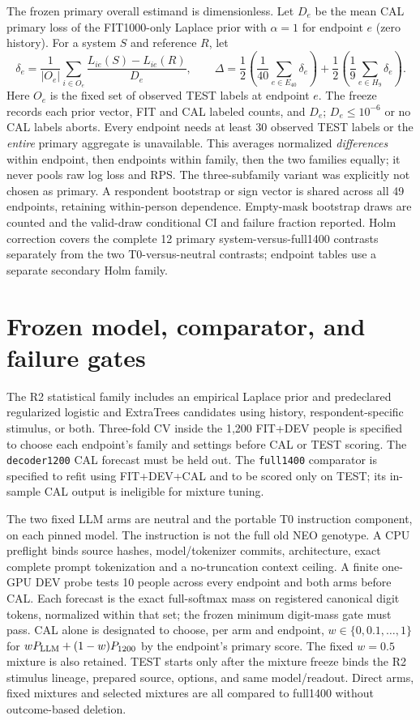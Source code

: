 \documentclass[10pt]{article}
\begin{document}
The frozen primary overall estimand is dimensionless. Let $D_e$ be the
mean CAL primary loss of the FIT1000-only Laplace prior with $\alpha=1$
for endpoint $e$ (zero history). For a system $S$ and reference $R$, let
\[
 \delta_e=\frac{1}{|O_e|}\sum_{i\in O_e}
 \frac{L_{ie}(S)-L_{ie}(R)}{D_e},\qquad
 \Delta=\frac12\left(\frac1{40}\sum_{e\in E_{40}}\delta_e\right)
       +\frac12\left(\frac1{9}\sum_{e\in H_9}\delta_e\right).
\]
Here $O_e$ is the fixed set of observed TEST labels at endpoint $e$.
The freeze records each prior vector, FIT and CAL labeled counts, and
$D_e$; $D_e\leq10^{-6}$ or no CAL labels aborts. Every endpoint needs at
least 30 observed TEST labels or the \emph{entire} primary aggregate is
unavailable. This averages normalized \emph{differences} within endpoint,
then endpoints within family, then the two families equally; it never pools
raw log loss and RPS. The three-subfamily variant was explicitly not chosen
as primary. A respondent bootstrap or sign vector is shared across all 49
endpoints, retaining within-person dependence. Empty-mask bootstrap draws
are counted and the valid-draw conditional CI and failure fraction reported.
Holm correction covers the complete 12 primary system-versus-full1400
contrasts separately from the two T0-versus-neutral contrasts; endpoint
tables use a separate secondary Holm family.

\section{Frozen model, comparator, and failure gates}
\label{sec:gates}
The R2 statistical family includes an empirical Laplace prior and
predeclared regularized logistic and ExtraTrees candidates using history,
respondent-specific stimulus, or both. Three-fold CV inside the 1,200
FIT+DEV people is specified to choose each endpoint's family and settings
before CAL or TEST scoring. The \texttt{decoder1200} CAL forecast must be
held out. The \texttt{full1400} comparator is specified to refit using
FIT+DEV+CAL and to be scored only on TEST; its in-sample CAL output is
ineligible for mixture tuning.

The two fixed LLM arms are neutral and the portable T0 instruction
component, on each pinned model. The instruction is not the full old NEO
genotype. A CPU preflight binds source hashes, model/tokenizer commits,
architecture, exact complete prompt tokenization and a no-truncation context
ceiling. A finite one-GPU DEV probe tests 10 people across every endpoint
and both arms before CAL. Each forecast is the exact full-softmax mass on
registered canonical digit tokens, normalized within that set; the frozen
minimum digit-mass gate must pass. CAL alone is designated to choose, per arm and endpoint,
$w\in\{0,0.1,\ldots,1\}$ for $wP_{\rm LLM}+(1-w)P_{1200}$ by the endpoint's
primary score. The fixed $w=0.5$ mixture is also retained. TEST starts only
after the mixture freeze binds the R2 stimulus lineage, prepared source,
options, and same model/readout. Direct arms, fixed mixtures and selected
mixtures are all compared to full1400 without outcome-based deletion.
\end{document}
